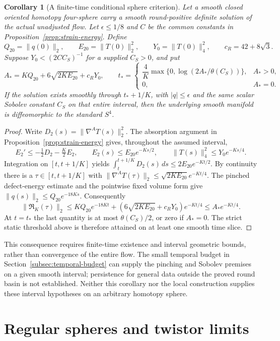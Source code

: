 \documentclass[11pt]{article}
\numberwithin{equation}{section}
\newtheorem{corollary}[theorem]{Corollary}
\theoremstyle{definition}
\theoremstyle{remark}
\begin{document}
\begin{corollary}[A finite-time conditional sphere criterion]
\label{cor:finite-time-sphere}
Let a smooth closed oriented homotopy four-sphere carry a smooth
round-positive definite solution of the actual unadjusted flow.
Let $\epsilon\le1/8$ and $C$ be the common constants in
Proposition~\ref{prop:strain-energy}. Define
\[
 Q_{20}=\|q(0)\|_2,\qquad E_{20}=\|T(0)\|_2^2,\qquad
 Y_0=\|T(0)\|_4^2,\qquad c_R=42+8\sqrt3.
\]
Suppose $Y_0<(2CC_S)^{-1}$ for a supplied $C_S>0$, and put
\[
 A_*=KQ_{20}+6\sqrt{2KE_{20}}+c_RY_0,\qquad
 t_*=\begin{cases}
 \dfrac4K\max\{0,\log(2A_*/\theta(C_S))\},&A_*>0,\\
 0,&A_*=0.
 \end{cases}
\]
If the solution exists smoothly through $t_*+1/K$, with
$|q|\le\epsilon$ and the same scalar Sobolev constant $C_S$
on that entire interval, then the underlying smooth manifold
is diffeomorphic to the standard $S^4$.
\end{corollary}
\begin{proof}
Write $D_2(s)=\|\nabla^A T(s)\|_2^2$.
The absorption argument in Proposition~\ref{prop:strain-energy}
gives, throughout the assumed interval,
\[
 E_2'\le-\tfrac12D_2-\tfrac K2 E_2,\qquad
 E_2(s)\le E_{20}e^{-Ks/2},\qquad
 \|T(s)\|_4^2\le Y_0e^{-Ks/4}.
\]
Integration on $[t,t+1/K]$ yields
$\int_t^{t+1/K}D_2(s)\,ds\le2E_{20}e^{-Kt/2}$.
By continuity there is a $\tau\in[t,t+1/K]$ with
$\|\nabla^A T(\tau)\|_2\le\sqrt{2KE_{20}}e^{-Kt/4}$.
The pinched defect-energy estimate and the pointwise fixed
volume form give $\|q(s)\|_2\le Q_{20}e^{-18Ks}$.
Consequently
\[
 \|\mathfrak R_K(\tau)\|_2
 \le KQ_{20}e^{-18Kt}
       +(6\sqrt{2KE_{20}}+c_RY_0)e^{-Kt/4}
 \le A_*e^{-Kt/4}.
\]
At $t=t_*$ the last quantity is at most $\theta(C_S)/2$,
or zero if $A_*=0$. The strict static threshold above is
therefore attained on at least one smooth time slice.
\end{proof}

This consequence requires finite-time existence and interval
geometric bounds, rather than convergence of the entire flow.
The small temporal budget in Section~\ref{subsec:temporal-budget}
can supply the pinching and Sobolev premises on a given smooth
interval; persistence for general data outside the proved
round basin is not established.
Neither this corollary nor the local construction supplies
these interval hypotheses on an arbitrary homotopy sphere.

\section{Regular spheres and twistor limits}
\label{sec:c0-twistor-limits}
\end{document}
